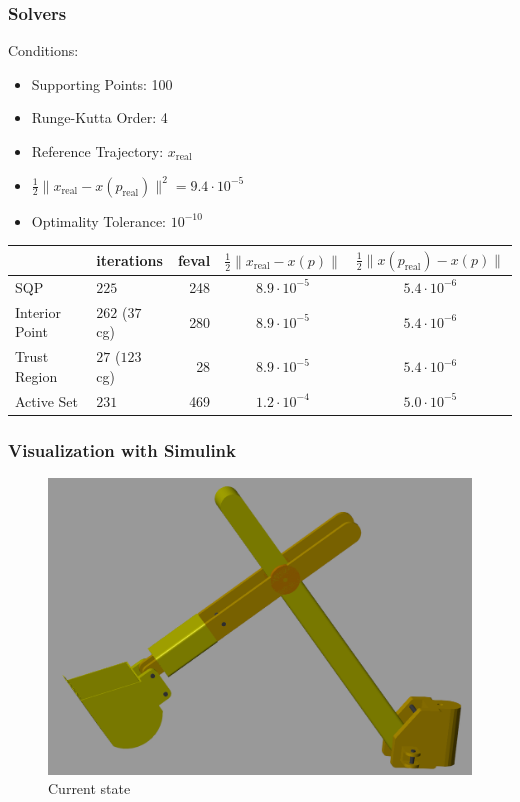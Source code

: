 \documentclass{beamer}
\begin{document}
\begin{frame}
    \frametitle{Solvers}
    Conditions:
    \begin{itemize}
        \item{Supporting Points: 100}
        \item{Runge-Kutta Order: 4}
        \item{Reference Trajectory: $x_{\text{real}}$}
        \item{$\frac{1}{2}\|x_{\text{real}} - x(p_\text{real})\|^2 = 9.4 \cdot 10^{-5}$}
        \item{Optimality Tolerance: $10^{-10}$}
    \end{itemize}

     \vspace{0.5cm}

     \begin{tabular}{l|lrcc}
         & iterations & feval & $\frac{1}{2}\|x_{\text{real}} - x(p)\|$ &  $\frac{1}{2}\|x(p_{\text{real}}) - x(p)\|$ \\
         \hline
         SQP             & $225$ & 248 & $8.9 \cdot 10^{-5}$ & $5.4 \cdot 10^{-6}$ \\
         Interior Point  & $262$ ($37$ cg) & 280 & $8.9 \cdot 10^{-5}$ & $5.4 \cdot 10^{-6}$ \\
         Trust Region    & $27$ ($123$ cg)  & 28 & $8.9 \cdot 10^{-5}$ & $5.4 \cdot 10^{-6}$ \\
         Active Set      & $231$  & 469 & $1.2 \cdot 10^{-4}$ & $5.0 \cdot 10^{-5}$ \\
     \end{tabular}
\end{frame}

\begin{frame}
	\frametitle{Visualization with Simulink}
	
	\begin{figure}
	\centering
	\includegraphics[width=0.7\linewidth]{img/excvis}
	\caption{Current state}
	\end{figure}

\end{frame}
\end{document}

